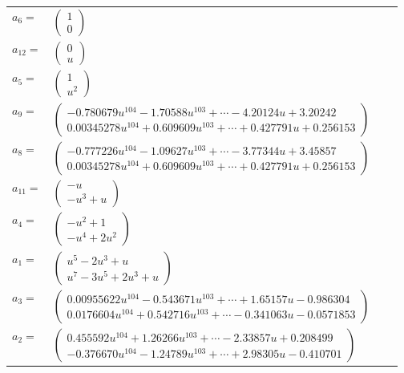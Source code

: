 \documentclass[1p]{elsarticle_modified}
\theoremstyle{definition}
\begin{document}
\begin{tabular}{m{7pt} m{180pt} m{7pt} m{180pt} }
\flushright $a_{6}=$&$\begin{pmatrix}1\\0\end{pmatrix}$ \\
\flushright $a_{12}=$&$\begin{pmatrix}0\\u\end{pmatrix}$ \\
\flushright $a_{5}=$&$\begin{pmatrix}1\\u^2\end{pmatrix}$ \\
\flushright $a_{9}=$&$\begin{pmatrix}-0.780679 u^{104}-1.70588 u^{103}+\cdots-4.20124 u+3.20242\\0.00345278 u^{104}+0.609609 u^{103}+\cdots+0.427791 u+0.256153\end{pmatrix}$ \\
\flushright $a_{8}=$&$\begin{pmatrix}-0.777226 u^{104}-1.09627 u^{103}+\cdots-3.77344 u+3.45857\\0.00345278 u^{104}+0.609609 u^{103}+\cdots+0.427791 u+0.256153\end{pmatrix}$ \\
\flushright $a_{11}=$&$\begin{pmatrix}- u\\- u^3+u\end{pmatrix}$ \\
\flushright $a_{4}=$&$\begin{pmatrix}- u^2+1\\- u^4+2 u^2\end{pmatrix}$ \\
\flushright $a_{1}=$&$\begin{pmatrix}u^5-2 u^3+u\\u^7-3 u^5+2 u^3+u\end{pmatrix}$ \\
\flushright $a_{3}=$&$\begin{pmatrix}0.00955622 u^{104}-0.543671 u^{103}+\cdots+1.65157 u-0.986304\\0.0176604 u^{104}+0.542716 u^{103}+\cdots-0.341063 u-0.0571853\end{pmatrix}$ \\
\flushright $a_{2}=$&$\begin{pmatrix}0.455592 u^{104}+1.26266 u^{103}+\cdots-2.33857 u+0.208499\\-0.376670 u^{104}-1.24789 u^{103}+\cdots+2.98305 u-0.410701\end{pmatrix}$ \\

\end{tabular}
\end{document}
